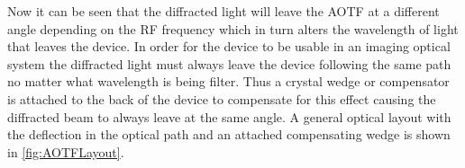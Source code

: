 Now it can be seen that the diffracted light will leave the AOTF at a different angle depending on the RF frequency which in turn alters the wavelength of light that leaves the device. In order for the device to be usable in an imaging optical system the diffracted light must always leave the device following the same path no matter what wavelength is being filter. Thus a crystal wedge or compensator is attached to the back of the device to compensate for this effect causing the diffracted beam to always leave at the same angle. A general optical layout with the deflection in the optical path and an attached compensating wedge is shown in \autoref{fig:AOTFLayout}.


